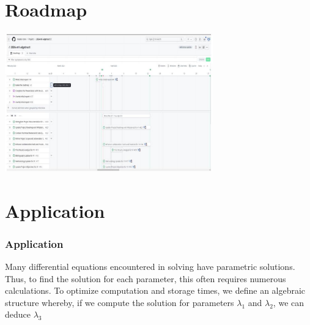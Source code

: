\documentclass{beamer}
\begin{document}
    \section{Roadmap}
    \begin{frame}
        \begin{center}
            \includegraphics[width=9cm, height=6cm]{roadmap.png}
        \end{center}
    \end{frame}
            




        
    \section{Application}
    \begin{frame}
        \frametitle{Application}
        Many differential equations encountered 
        in solving have parametric solutions.
        Thus, to find the solution for each 
        parameter, this often requires 
        numerous calculations. To optimize 
        computation and storage times, we 
        define an algebraic structure 
        whereby, if we compute the solution 
        for parameters $\lambda_1$ and $ \lambda_2 $,
        we can deduce $\lambda_3$
    \end{frame}

    
    
\end{document}
